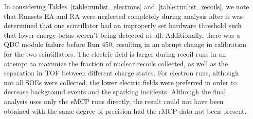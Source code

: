 In considering Tables~\ref{table:runlist_electrons} and~\ref{table:runlist_recoils}, we note that Runsets EA and RA were neglected completely during analysis after it was determined that one scintillator had an improperly set hardware threshold such that lower energy betas weren't being detected at all.  Additionally, there was a QDC module failure before Run 450, resulting in an abrupt change in calibration for the two scintillators.  The electric field is larger during recoil runs in an attempt to maximize the fraction of nuclear recoils collected, as well as the separation in TOF between different charge states.  For electron runs, although not all SOEs were collected, the lower electric fields were preferred in order to decrease background events and the sparking incidents.   Although the final analysis uses only the eMCP runs directly, the result could not have been obtained with the same degree of precision had the rMCP data not been present.  



 


